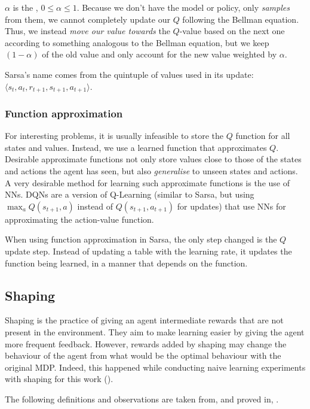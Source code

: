 $\alpha$ is the , $0\leq\alpha\leq 1$. Because we
don't have the model or policy, only \emph{samples} from them, we cannot
completely update our $Q$ following the Bellman equation. Thus, we instead
\emph{move our value towards} the $Q$-value based on the next one according to
something analogous to the Bellman equation, but we keep $(1-\alpha)$ of the old
value and only account for the new value weighted by $\alpha$.

Sarsa's name comes from the quintuple of values used in its update:
$\langle s_t, a_t, r_{t+1}, s_{t+1}, a_{t+1}\rangle$.

\citep[Section~6.4]{sutton1998introduction}

\subsubsection{Function approximation}
For interesting problems, it is usually infeasible to store the $Q$ function for
all states and values. Instead, we use a learned function that approximates $Q$.
Desirable approximate functions not only store values close to those of the states and
actions the agent has seen, but also \emph{generalise} to unseen states and
actions. A very desirable method for learning such approximate functions is the
use of \acfp{NN}. \acfp{DQN} \citep{mnih2015human} are a version of Q-Learning
(similar to Sarsa, but using $\max_a Q(s_{t+1},a)$ instead of $Q(s_{t+1},
a_{t+1})$ for updates) that use \acp{NN} for approximating the action-value
function.

When using function approximation in Sarsa, the only step changed is the $Q$
update step. Instead of updating a table with the learning rate, it updates the
function being learned, in a manner that depends on the function.

\subsection{Shaping\label{subsec:shaping}}
Shaping is the practice of giving an agent intermediate rewards that are not
present in the environment. They aim to make learning easier by giving the agent
more frequent feedback. However, rewards added by shaping may change the
behaviour of the agent from what would be the optimal behaviour with the original
\ac{MDP}. Indeed, this happened while
conducting naive learning experiments with shaping for this work
().

The following definitions and observations are taken from, and proved in,
\citet{ng1999policy}.

